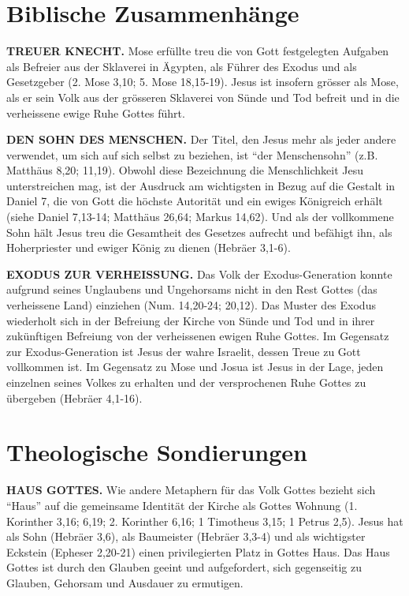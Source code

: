 \documentclass[headsepline=true]{book}
\begin{document}
\section{Biblische Zusammenhänge}\label{biblische-zusammenhuxe4nge-2}

\textbf{TREUER KNECHT.} Mose erfüllte treu die von Gott festgelegten
Aufgaben als Befreier aus der Sklaverei in Ägypten, als Führer des
Exodus und als Gesetzgeber (2. Mose 3,10; 5. Mose 18,15-19). Jesus ist
insofern grösser als Mose, als er sein Volk aus der grösseren Sklaverei
von Sünde und Tod befreit und in die verheissene ewige Ruhe Gottes
führt.

\textbf{DEN SOHN DES MENSCHEN.} Der Titel, den Jesus mehr als jeder
andere verwendet, um sich auf sich selbst zu beziehen, ist ``der
Menschensohn'' (z.B. Matthäus 8,20; 11,19). Obwohl diese Bezeichnung die
Menschlichkeit Jesu unterstreichen mag, ist der Ausdruck am wichtigsten
in Bezug auf die Gestalt in Daniel 7, die von Gott die höchste Autorität
und ein ewiges Königreich erhält (siehe Daniel 7,13-14; Matthäus 26,64;
Markus 14,62). Und als der vollkommene Sohn hält Jesus treu die
Gesamtheit des Gesetzes aufrecht und befähigt ihn, als Hoherpriester und
ewiger König zu dienen (Hebräer 3,1-6).

\textbf{EXODUS ZUR VERHEISSUNG.} Das Volk der Exodus-Generation konnte
aufgrund seines Unglaubens und Ungehorsams nicht in den Rest Gottes (das
verheissene Land) einziehen (Num. 14,20-24; 20,12). Das Muster des
Exodus wiederholt sich in der Befreiung der Kirche von Sünde und Tod und
in ihrer zukünftigen Befreiung von der verheissenen ewigen Ruhe Gottes.
Im Gegensatz zur Exodus-Generation ist Jesus der wahre Israelit, dessen
Treue zu Gott vollkommen ist. Im Gegensatz zu Mose und Josua ist Jesus
in der Lage, jeden einzelnen seines Volkes zu erhalten und der
versprochenen Ruhe Gottes zu übergeben (Hebräer 4,1-16).

\section{Theologische Sondierungen}\label{theologische-sondierungen}

\textbf{HAUS GOTTES.} Wie andere Metaphern für das Volk Gottes bezieht
sich ``Haus'' auf die gemeinsame Identität der Kirche als Gottes Wohnung
(1. Korinther 3,16; 6,19; 2. Korinther 6,16; 1 Timotheus 3,15; 1 Petrus
2,5). Jesus hat als Sohn (Hebräer 3,6), als Baumeister (Hebräer 3,3-4)
und als wichtigster Eckstein (Epheser 2,20-21) einen privilegierten
Platz in Gottes Haus. Das Haus Gottes ist durch den Glauben geeint und
aufgefordert, sich gegenseitig zu Glauben, Gehorsam und Ausdauer zu
ermutigen.
\end{document}
